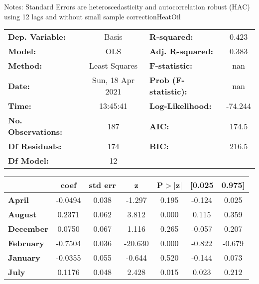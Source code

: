 Notes: \newline
 [1] Standard Errors are heteroscedasticity and autocorrelation robust (HAC) using 12 lags and without small sample correctionHeatOil\begin{center}
\begin{tabular}{lclc}
\toprule
\textbf{Dep. Variable:}    &      Basis       & \textbf{  R-squared:         } &     0.423   \\
\textbf{Model:}            &       OLS        & \textbf{  Adj. R-squared:    } &     0.383   \\
\textbf{Method:}           &  Least Squares   & \textbf{  F-statistic:       } &       nan   \\
\textbf{Date:}             & Sun, 18 Apr 2021 & \textbf{  Prob (F-statistic):} &      nan    \\
\textbf{Time:}             &     13:45:41     & \textbf{  Log-Likelihood:    } &   -74.244   \\
\textbf{No. Observations:} &         187      & \textbf{  AIC:               } &     174.5   \\
\textbf{Df Residuals:}     &         174      & \textbf{  BIC:               } &     216.5   \\
\textbf{Df Model:}         &          12      & \textbf{                     } &             \\
\bottomrule
\end{tabular}
\begin{tabular}{lcccccc}
                   & \textbf{coef} & \textbf{std err} & \textbf{z} & \textbf{P$> |$z$|$} & \textbf{[0.025} & \textbf{0.975]}  \\
\midrule
\textbf{April}     &      -0.0494  &        0.038     &    -1.297  &         0.195        &       -0.124    &        0.025     \\
\textbf{August}    &       0.2371  &        0.062     &     3.812  &         0.000        &        0.115    &        0.359     \\
\textbf{December}  &       0.0750  &        0.067     &     1.116  &         0.265        &       -0.057    &        0.207     \\
\textbf{February}  &      -0.7504  &        0.036     &   -20.630  &         0.000        &       -0.822    &       -0.679     \\
\textbf{January}   &      -0.0355  &        0.055     &    -0.644  &         0.520        &       -0.144    &        0.073     \\
\textbf{July}      &       0.1176  &        0.048     &     2.428  &         0.015        &        0.023    &        0.212     \\

\end{tabular}
\end{center}
